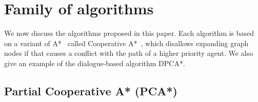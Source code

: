 \section{Family of algorithms}\label{sec:method}
We now discuss the algorithms proposed in this paper. Each algorithm is 
based on a variant of A*~\cite{hart1968} called Cooperative 
A*~\cite{silver2005}, which disallows expanding graph nodes if that 
causes a conflict with the path of a higher priority agent. We also give an 
example of the dialogue-based algorithm DPCA*.


\subsection{Partial Cooperative A* (PCA*)}

